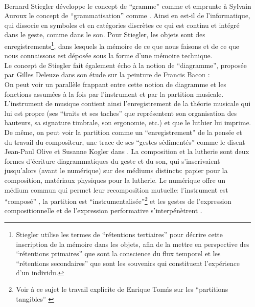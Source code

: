 \\
\indent Bernard Stiegler développe le concept de ``gramme'' comme  et emprunte à Sylvain Auroux \cite{auroux_revolution_1994} le concept de ``grammatisation'' comme . Ainsi en est-il de l'informatique, qui dissocie en symboles et en catégories discrètes ce qui est continu et intégré dans le geste, comme dans le son. Pour Stiegler, les objets sont des enregistrements\footnote{Stiegler utilise les termes de ``rétentions tertiaires'' pour décrire cette inscription de la mémoire dans les objets, afin de la mettre en perspective des ``rétentions primaires'' que sont la conscience du flux temporel et les ``rétentions secondaires'' que sont les souvenirs qui constituent l'expérience d'un individu.}, dans lesquels la mémoire de ce que nous faisons et de ce que nous connaissons est déposée sous la forme d'une mémoire technique.\\
\indent Le concept de Stiegler fait également écho à la notion de ``diagramme'', proposée par Gilles Deleuze dans son étude sur la peinture de Francis Bacon \cite{deleuze_francis_1981} : \\
\indent On peut voir un parallèle frappant entre cette notion de diagramme et les fonctions assumées à la fois par l'instrument et par la partition musicale. L'instrument de musique contient ainsi l'enregistrement de la théorie musicale qui lui est propre (ses ``traits et ses taches'' que représentent son organisation des hauteurs, sa signature timbrale, son ergonomie, etc.) et que le luthier lui imprime. De même, on peut voir la partition comme un ``enregistrement'' de la pensée et du travail du compositeur, une trace de ses ``gestes sédimentés'' comme le disent Jean-Paul Olive et Susanne Kogler dans \cite{olive_expression_2013}. La composition et la lutherie sont deux formes d’écriture diagrammatiques du geste et du son, qui s’inscrivaient jusqu’alors (avant le numérique) sur des médiums distincts: papier pour la composition, matériaux physiques pour la lutherie. Le numérique offre un médium commun qui permet leur recomposition mutuelle: l'instrument est ``composé'' \cite{schnell_introducing_2002}, la partition est ``instrumentalisée''\footnote{Voir à ce sujet le travail explicite de Enrique Tomás sur les ``partitions tangibles'' \cite{tomas_tangible_2014}} et les gestes de l'expression compositionnelle et de l'expression performative s'interpénètrent \cite{dobrian_e_2006}.\\
